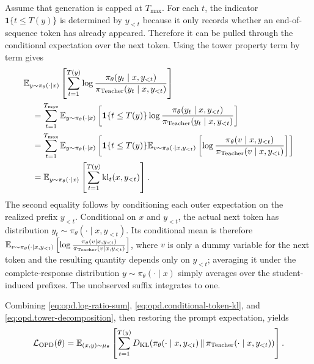 Assume that generation is capped at $T_{\max}$. For each $t$, the indicator
$\mathbf{1}\{t\leq T(y)\}$ is determined by $y_{<t}$ because it only records
whether an end-of-sequence token has already appeared. Therefore it can be
pulled through the conditional expectation over the next token. Using the
tower property term by term gives
\begin{align}
    &\mathbb{E}_{y\sim\pi_\theta(\cdot\mid x)}
    \left[
        \sum_{t=1}^{T(y)}
        \log\frac{\pi_\theta(y_t\mid x,y_{<t})}{\pi_{\mathrm{Teacher}}(y_t\mid x,y_{<t})}
    \right]
    \nonumber\\
    &\quad=
    \sum_{t=1}^{T_{\max}}
    \mathbb{E}_{y\sim\pi_\theta(\cdot\mid x)}
    \left[
        \mathbf{1}\{t\leq T(y)\}
        \log\frac{\pi_\theta(y_t\mid x,y_{<t})}{\pi_{\mathrm{Teacher}}(y_t\mid x,y_{<t})}
    \right]
    \nonumber\\
    &\quad=
    \sum_{t=1}^{T_{\max}}
    \mathbb{E}_{y\sim\pi_\theta(\cdot\mid x)}
    \left[
        \mathbf{1}\{t\leq T(y)\}
        \mathbb{E}_{v\sim\pi_\theta(\cdot\mid x,y_{<t})}
        \left[\log\frac{\pi_\theta(v\mid x,y_{<t})}{\pi_{\mathrm{Teacher}}(v\mid x,y_{<t})}\right]
    \right]
    \nonumber\\
    &\quad=
    \mathbb{E}_{y\sim\pi_\theta(\cdot\mid x)}
    \left[
        \sum_{t=1}^{T(y)}
        \mathrm{kl}_t(x,y_{<t})
    \right].
    \label{eq:opd.tower-decomposition}
\end{align}
The second equality follows by conditioning each outer expectation on the
realized prefix $y_{<t}$. Conditional on $x$ and $y_{<t}$, the actual next
token has distribution
$y_t\sim\pi_\theta(\cdot\mid x,y_{<t})$. Its conditional mean is therefore
$\mathbb{E}_{v\sim\pi_\theta(\cdot\mid x,y_{<t})} \left[\log\frac{\pi_\theta(v\mid x,y_{<t})}{\pi_{\mathrm{Teacher}}(v\mid x,y_{<t})}\right]$, where $v$ is only a dummy variable for the next token and the resulting quantity depends only on $y_{<t}$;
averaging it under the complete-response distribution $y\sim
\pi_\theta(\cdot\mid x)$ simply averages over the student-induced prefixes.
The unobserved suffix integrates to one.

Combining \eqref{eq:opd.log-ratio-sum},
\eqref{eq:opd.conditional-token-kl}, and
\eqref{eq:opd.tower-decomposition}, then restoring the prompt expectation,
yields
\begin{align}
    {\cal L}_{\mathrm{OPD}}(\theta)
    =
    \mathbb{E}_{(x,y)\sim\mu_\theta}
    \left[
        \sum_{t=1}^{T(y)}
        D_{\mathrm{KL}}\!\left(
            \pi_\theta(\cdot\mid x,y_{<t})
            \,\middle\|\,
            \pi_{\mathrm{Teacher}}(\cdot\mid x,y_{<t})
        \right)
    \right].
    \label{eq:opd.token-kl}
\end{align}

